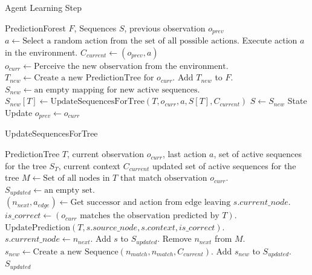 \documentclass[11pt]{article}
\begin{document}
\begin{algorithm}[H]
\caption{Agent Learning Step}
\label{alg:agent_step}
\begin{algorithmic}[1]
\Require PredictionForest $F$, Sequences $S$, previous observation $o_{prev}$
\State $a \gets \text{Select a random action from the set of all possible actions.}$ 
\State Execute action $a$ in the environment.
\State $C_{current} \gets (o_{prev}, a)$ 
\State $o_{curr} \gets \text{Perceive the new observation from the environment.}$ 
 
    \State $T_{new} \gets \text{Create a new PredictionTree for } o_{curr}.$
    \State Add $T_{new}$ to $F$.
\EndIf
\State $S_{new} \gets \text{an empty mapping for new active sequences.}$
 
    \State $S_{new}[T] \gets \text{UpdateSequencesForTree}(T, o_{curr}, a, S[T], C_{current})$
\EndFor
\State $S \gets S_{new}$ State Update 
\State $o_{prev} \gets o_{curr}$
\end{algorithmic}
\end{algorithm}

\begin{algorithm}[H]
\caption{UpdateSequencesForTree}
\label{alg:update_sequences}
\begin{algorithmic}[1]
\Require PredictionTree $T$, current observation $o_{curr}$, last action $a$, set of active sequences for the tree $S_T$, current context $C_{current}$
\Ensure updated set of active sequences for the tree
\State $M \gets \text{Set of all nodes in } T \text{ that match observation } o_{curr}.$
\State $S_{updated} \gets \text{an empty set.}$
 
    \State $(n_{next}, a_{edge}) \gets \text{Get successor and action from edge leaving } s.current\_node.$
         
            \State $is\_correct \gets (o_{curr} \text{ matches the observation predicted by } T).$
            \State $\text{UpdatePrediction}(T, s.source\_node, s.context, is\_correct).$
         
            \State $s.current\_node \gets n_{next}.$
            \State Add $s$ to $S_{updated}.$
            \State Remove $n_{next}$ from $M$.
        \EndIf
    \EndIf
\EndFor
{} 
    \State $s_{new} \gets \text{Create a new Sequence}(n_{match}, n_{match}, C_{current}).$
    \State Add $s_{new}$ to $S_{updated}.$
\EndFor
\State \Return $S_{updated}$
\end{algorithmic}
\end{algorithm}
\end{document}
